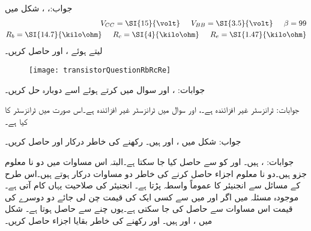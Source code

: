 جواب:، ، 
شکل   میں
\begin{align*}
V_{CC}=\SI{15}{\volt} \hspace{5mm} V_{BB}=\SI{3.5}{\volt} \hspace{5mm} \beta=99\\
R_b=\SI{14.7}{\kilo \ohm} \hspace{5mm} R_c=\SI{4}{\kilo \ohm}  \hspace{5mm} R_e=\SI{1.47}{\kilo \ohm}
\end{align*}
لیتے ہوئے ،  اور  حاصل کریں۔
\begin{figure}
\centering
\texttt{[image: transistorQuestionRbRcRe]}
\caption{}
\label{شکل_سوال_ٹرانزسٹر_یکسمتی_دور_ب}
\end{figure}

جوابات: ،  اور 
سوال  میں   کرتے ہوئے اسے دوبارہ حل کریں۔

جوابات: ٹرانزسٹر غیر افزائندہ ہے۔،  اور 
سوال  میں ٹرانزسٹر غیر افزائندہ ہے۔اس صورت میں ٹرانزسٹر کا  کیا ہے۔

جواب: 
شکل  میں ،  اور  ہیں۔ رکھنے کی خاطر درکار  اور   حاصل کریں۔

جوابات: ،  ہیں۔ اور  کو  سے حاصل کیا جا سکتا ہے۔البتہ اس مساوات میں دو نا معلوم جزو ہیں۔دو نا معلوم اجزاء حاصل کرنے کی خاطر دو مساوات درکار ہوتے ہیں۔اس طرح کے مسائل سے انجنیئر کا عموماً واسطہ پڑتا ہے۔ انجنیئر کی صلاحیت یہاں کام آتی ہے۔موجودہ مسئلہ میں اگر  اور  میں سے کسی ایک کی قیمت چن لی جائے دو دوسرے کی قیمت اس مساوات سے حاصل کی جا سکتی ہے۔یوں  چنے سے  حاصل ہوتا ہے۔  
شکل  میں ،  اور  ہیں۔  اور  رکھنے کی خاطر بقایا اجزاء حاصل کریں۔


